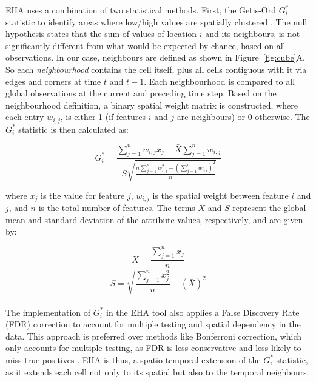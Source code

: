 EHA uses a combination of two statistical methods. First, the Getis-Ord \(G_i^*\) statistic to identify areas where low/high values are spatially clustered \citep{getis_ord}. The null hypothesis
states that the sum of values of location \( i \) and its neighbours, is not significantly different from what would be expected by chance, based on all observations. In our case, neighbours are
defined as shown in Figure~\ref{fig:cube}A. So each \textit{neighbourhood} contains the cell itself, plus all cells contiguous with it via edges and corners at time \(t\) and \(t-1\).
Each neighbourhood is compared to all global observations at the current and preceding time step. Based on the neighbourhood definition,
a binary spatial weight matrix is constructed, where each entry \(w_{i,j}\), is either 1 (if features \(i\) and \(j\) are neighbours) or 0 otherwise. The \(G_i^*\) statistic is then
calculated as:

\begin{equation}
G_i^* = \frac{\displaystyle\sum_{j=1}^{n} w_{i,j} x_j - \bar{X} \displaystyle\sum_{j=1}^{n} w_{i,j}}{S \sqrt{\frac{n \displaystyle\sum_{j=1}^{n} w_{i,j}^2 - \left( \displaystyle\sum_{j=1}^{n} w_{i,j} \right)^2}{n-1}}}
\end{equation}

\bigskip

where \( x_j \) is the value for feature \( j \), 
\( w_{i,j} \) is the spatial weight between feature \( i \) and \( j \), 
and \( n \) is the total number of features. The terms \( \bar{X} \) and \( S \) represent the global mean and standard deviation
of the attribute values, respectively, and are given by:

\begin{equation}
\bar{X} = \frac{\displaystyle\sum_{j=1}^{n} x_j}{n}
\end{equation}
\medskip
\begin{equation}
S = \sqrt{ \frac{\displaystyle\sum_{j=1}^{n} x_j^2}{n} - \left(\bar{X}\right)^2 }
\end{equation}\\

The implementation of \(G_i^*\) in the EHA tool also applies a False Discovery Rate (FDR) correction to account for multiple testing and spatial dependency in the data.
This approach is preferred over methods like Bonferroni correction, which only accounts for multiple testing, as FDR is less conservative and less likely to miss true 
positives \citep{fdr_correction}. EHA is thus, a spatio-temporal extension of the \(G_i^*\) statistic, as it extends each cell not only to its spatial but
also to the temporal neighbours. 

